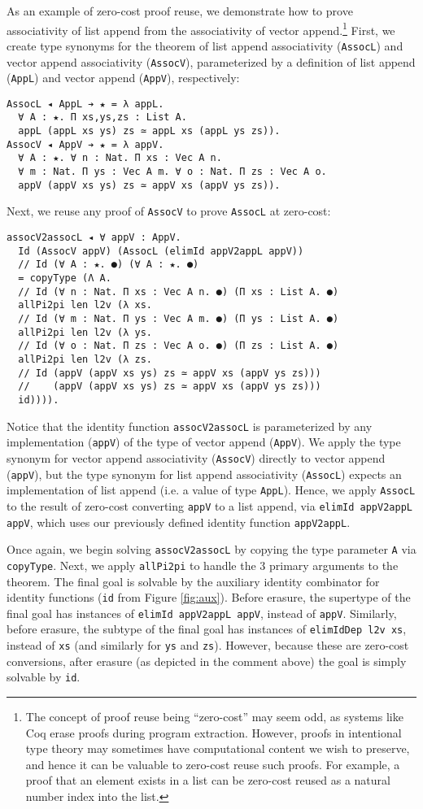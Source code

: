 \documentclass[acmsmall,screen]{acmart}
\newcommand{\reffig}[1]{Figure \ref{fig:#1}}
\begin{document}
As an example of zero-cost proof reuse, we demonstrate how to prove
associativity of list append from the associativity of vector
append.\footnote{
  The concept of proof reuse being ``zero-cost'' may seem odd,
  as systems like Coq erase proofs during program
  extraction. However, proofs in intentional type theory may sometimes
  have computational content we wish to preserve,
  and hence it can be valuable to zero-cost reuse such proofs. For
  example, a proof that an element exists in a list can be zero-cost
  reused as a natural number index into the list.
}
First, we create type synonyms for the theorem of list append
associativity (\verb;AssocL;) and vector append associativity
(\verb;AssocV;), parameterized by a definition of list append
(\verb;AppL;) and vector append (\verb;AppV;), respectively:
\begin{verbatim}
AssocL ◂ AppL ➔ ★ = λ appL.
  ∀ A : ★. Π xs,ys,zs : List A.  
  appL (appL xs ys) zs ≃ appL xs (appL ys zs)).
AssocV ◂ AppV ➔ ★ = λ appV.
  ∀ A : ★. ∀ n : Nat. Π xs : Vec A n.
  ∀ m : Nat. Π ys : Vec A m. ∀ o : Nat. Π zs : Vec A o.
  appV (appV xs ys) zs ≃ appV xs (appV ys zs)).
\end{verbatim}
Next, we reuse any proof of \verb;AssocV; to prove
\verb;AssocL; at zero-cost:
\begin{verbatim}
assocV2assocL ◂ ∀ appV : AppV.
  Id (AssocV appV) (AssocL (elimId appV2appL appV))
  // Id (∀ A : ★. ●) (∀ A : ★. ●)
  = copyType (Λ A.
  // Id (∀ n : Nat. Π xs : Vec A n. ●) (Π xs : List A. ●)
  allPi2pi len l2v (λ xs.
  // Id (∀ m : Nat. Π ys : Vec A m. ●) (Π ys : List A. ●)
  allPi2pi len l2v (λ ys.
  // Id (∀ o : Nat. Π zs : Vec A o. ●) (Π zs : List A. ●)
  allPi2pi len l2v (λ zs.
  // Id (appV (appV xs ys) zs ≃ appV xs (appV ys zs)))
  //    (appV (appV xs ys) zs ≃ appV xs (appV ys zs)))
  id)))).
\end{verbatim}
Notice that the identity function \verb;assocV2assocL; is parameterized
by any implementation (\verb;appV;) of the type of vector append
(\verb;AppV;). We apply the type synonym for vector append associativity
(\verb;AssocV;) directly to vector append (\verb;appV;), but the type
synonym for list append associativity (\verb;AssocL;) expects an
implementation of list append (i.e. a value of type
\verb;AppL;). Hence, we apply \verb;AssocL; to the result of
zero-cost converting \verb;appV; to a list append, via
\verb;elimId appV2appL appV;, which uses our
previously defined identity function \verb;appV2appL;.

Once again, we begin solving \verb;assocV2assocL; by copying the type
parameter \verb;A; via \verb;copyType;. Next, we apply \verb;allPi2pi;
to handle the 3 primary arguments to the theorem. The final goal is
solvable by the auxiliary identity combinator for identity functions
(\verb;id; from \reffig{aux}). Before erasure, the supertype of the
final goal has instances of \verb;elimId appV2appL appV;, instead of
\verb;appV;. Similarly, before erasure, the subtype of the final goal has instances
of \verb;elimIdDep l2v xs;, instead of \verb;xs; (and similarly for
\verb;ys; and \verb;zs;).  However, because these are zero-cost
conversions, after erasure (as depicted in the comment above) the goal
is simply solvable by \verb;id;.
\end{document}
